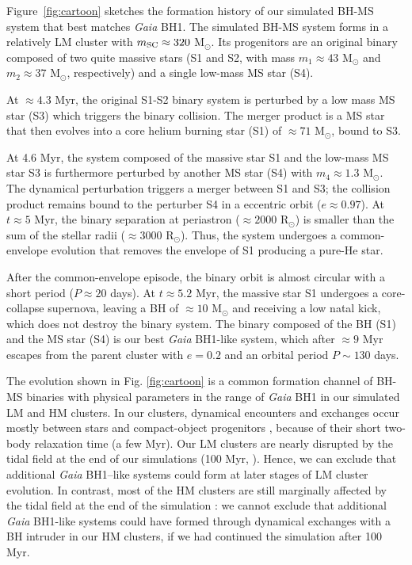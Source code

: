 \documentclass[fleqn,usenatbib]{mnras}
\newcommand{\Ms}{M$_\odot$}
\newcommand{\bh}{\textit{Gaia} BH1}
\begin{document}
Figure~\ref{fig:cartoon} sketches the formation history of our  
simulated 
BH-MS system 
that best matches \bh{}. 
The simulated BH-MS system forms in a relatively LM cluster with $m_{\rm{SC}}\approx 320$ \Ms.
Its progenitors are an original binary composed of two quite massive stars (S1 and S2, with mass $m_{1} \approx 43$ \Ms{} and $m_{2} \approx 37$ \Ms{}, respectively) and a single low-mass MS star (S4).


At $\approx{4.3}$ Myr, the original S1-S2 binary system is perturbed by a low mass MS star (S3) which triggers the binary collision. The merger product is a MS star that  
then evolves into a core helium burning star (S1) of $\approx 71$ \Ms{}, bound to S3. 

At 4.6 Myr, the system composed of the massive star S1 and the low-mass MS star S3 is furthermore perturbed by another MS star (S4) with $m_{4} \approx 1.3$ \Ms{}. 
The dynamical perturbation 
triggers a merger between S1 and S3; the collision product remains bound to the perturber S4 in a eccentric orbit ($e\approx0.97$). 
At $t\approx5$ Myr, the binary separation at periastron ($\approx 2000 $ R$_{\odot}$) is smaller than the sum of the stellar radii ($\approx 3000 $ R$_{\odot}$). Thus, the system undergoes a common-envelope evolution that removes the envelope of S1 producing a pure-He star.



After the common-envelope episode, the binary orbit is almost circular with a short period ($P \approx 20 $ days). At $t\approx5.2$ Myr, the massive star S1 undergoes a core-collapse supernova, leaving a BH of $\approx 10$ \Ms{} and receiving a low natal kick,  which does not destroy the binary system.
The binary composed of the BH (S1) and the MS star (S4) is our best \bh{}-like system, which after  $\approx{9}$ Myr escapes from the parent cluster with $e=0.2$ and an orbital period $P\sim 130$ days.

The evolution shown in Fig. \ref{fig:cartoon} is 
a common formation channel of BH-MS binaries with physical parameters in the range of \bh{} in our simulated LM and HM clusters. In our clusters, dynamical encounters and exchanges occur mostly between stars and compact-object progenitors \citep{dicarlo20,Rastello20,rastello2021,torniamenti2022}, because of their short two-body relaxation time (a few Myr). 
Our LM clusters are nearly disrupted by the tidal field at the end of our simulations (100 Myr, \citealt{torniamenti2022}). Hence, we can exclude that additional \bh--like systems could form at later stages of LM cluster evolution.
In contrast, most of the HM clusters are still marginally  affected by the tidal field at the end of the simulation \citep{dicarlo20}: we cannot exclude that additional \bh{}-like systems could have formed through 
dynamical exchanges with a BH intruder in our HM clusters, if we 
had continued the simulation after 100 Myr. 
\end{document}
